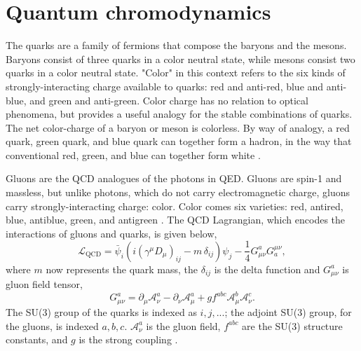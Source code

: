 \section{Quantum chromodynamics}

The quarks are a family of fermions that compose the baryons and the mesons. Baryons consist of three quarks in a color neutral state, while mesons consist two quarks in a color neutral state. "Color" in this context refers to the six kinds of strongly-interacting charge available to quarks: red and anti-red, blue and anti-blue, and green and anti-green. Color charge has no relation to optical phenomena, but provides a useful analogy for the stable combinations of quarks. The net color-charge of a baryon or meson is colorless. By way of analogy, a red quark, green quark, and blue quark can together form a hadron, in the way that conventional red, green, and blue can together form white \cite{Brock:1993sz}. 

Gluons are the QCD analogues of the photons in QED. Gluons are spin-1 and massless, but unlike photons, which do not carry electromagnetic charge, gluons carry strongly-interacting charge: color. Color comes six varieties: red, antired, blue, antiblue, green, and antigreen \cite{Wilczek:2000ih}. The QCD Lagrangian, which encodes the interactions of gluons and quarks, is given below,
\begin{equation}
{\mathcal {L}}_{\mathrm {QCD} }={\bar {\psi }}_{i}\left(i(\gamma ^{\mu }D_{\mu })_{ij}-m\,\delta _{ij}\right)\psi _{j}-{\frac {1}{4}}G_{\mu \nu }^{a}G_{a}^{\mu \nu },
\end{equation}
where $m$ now represents the quark mass, the $\delta_{ij}$ is the delta function and $G_{\mu \nu }^{a}$ is gluon field tensor,  
\begin{equation}
\displaystyle G_{\mu \nu }^{a}=\partial _{\mu }{\mathcal {A}}_{\nu }^{a}-\partial _{\nu }{\mathcal {A}}_{\mu }^{a}+gf^{abc}{\mathcal {A}}_{\mu }^{b}{\mathcal {A}}_{\nu }^{c}.
\end{equation}
The SU(3) group of the quarks is indexed as $i,j,...$; the adjoint SU(3) group, for the gluons, is indexed $a,b,c$. ${\mathcal {A}}_{\nu }^{a}$ is the gluon field, $f^{abc}$ are the SU(3) structure constants, and $g$ is the strong coupling \cite{Schafer:2005ff}. 

